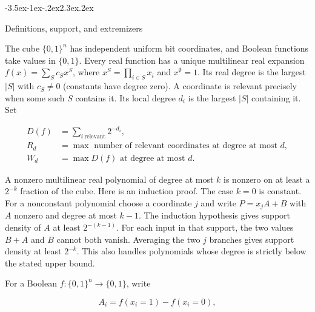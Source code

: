 \documentclass[11pt]{article}
\makeatletter
\renewcommand\section{\@startsection{section}{1}{\z@}
  {-3.5ex\@plus -1ex\@minus -.2ex}{2.3ex\@plus .2ex}
  {\normalfont\Large\bfseries\raggedright}}
\theoremstyle{remark}
\theoremstyle{correctionstyle}
\makeatother
\begin{document}
\clearpage
\section{Definitions, support, and extremizers}\label{src-p003}\label{src-end-p003}

\leavevmode\label{src-p004}The cube $\{0,1\}^n$ has independent uniform bit coordinates, and Boolean
functions take values in $\{0,1\}$. Every real function has a unique
multilinear real expansion $f(x)=\sum_S c_S x^S$, where
$x^S=\prod_{i\in S}x_i$ and $x^\emptyset=1$.
Its real degree is the largest $|S|$ with $c_S\ne0$ (constants have degree zero).
A coordinate is relevant precisely when some such $S$ contains it. Its local
degree $d_i$ is the largest $|S|$ containing it. Set\label{src-end-p004}\par

\begin{equation}
\begin{aligned}
D(f)&=\sum_{i\ \mathrm{relevant}}2^{-d_i},\\
R_d&=\max\text{ number of relevant coordinates at degree at most }d,\\
W_d&=\max D(f)\text{ at degree at most }d.
\end{aligned}\tag*{}
\label{src-p005}
\end{equation}

\leavevmode\label{src-p006}A nonzero multilinear real polynomial of degree at most $k$ is nonzero on
at least a $2^{-k}$ fraction of the cube. Here is an induction proof. The case
$k=0$ is constant. For a nonconstant polynomial choose a coordinate $j$ and
write $P=x_jA+B$ with $A$ nonzero and degree at most $k-1$. The induction
hypothesis gives support density of $A$ at least $2^{-(k-1)}$. For each input
in that support, the two values $B+A$ and $B$ cannot both vanish. Averaging
the two $j$ branches gives support density at least $2^{-k}$. This also handles
polynomials whose degree is strictly below the stated upper bound.\label{src-end-p006}\par

\leavevmode\label{src-p007}For a Boolean $f:\{0,1\}^n\to\{0,1\}$, write\label{src-end-p007}\par

\begin{equation}
A_i=f(x_i{=}1)-f(x_i{=}0),\tag*{}
\label{src-p008}
\end{equation}
\end{document}
